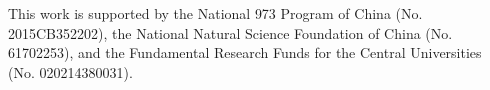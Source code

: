 This work is supported by the National 973 Program of China (No. 2015CB352202),
the National Natural Science Foundation of China (No. 61702253),
and the Fundamental Research Funds for the Central Universities (No. 020214380031).
